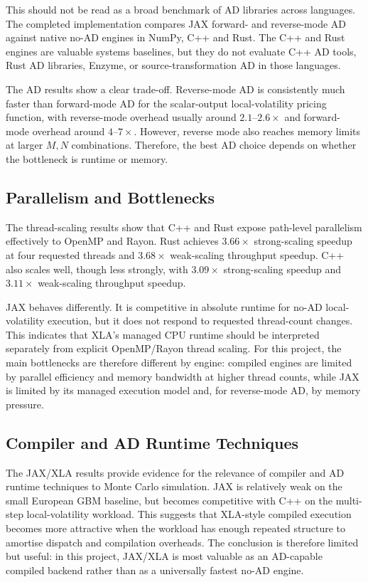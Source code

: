 This should not be read as a broad benchmark of AD libraries across languages.
The completed implementation compares JAX forward- and reverse-mode AD against
native no-AD engines in NumPy, C++ and Rust. The C++ and Rust engines are
valuable systems baselines, but they do not evaluate C++ AD tools, Rust AD
libraries, Enzyme, or source-transformation AD in those languages.

The AD results show a clear trade-off.  Reverse-mode AD is consistently much
faster than forward-mode AD for the scalar-output local-volatility pricing
function, with reverse-mode overhead usually around \(2.1\)--\(2.6\times\)
and forward-mode overhead around \(4\)--\(7\times\).  However, reverse mode
also reaches memory limits at larger \(M,N\) combinations.  Therefore, the
best AD choice depends on whether the bottleneck is runtime or memory.

\subsection{Parallelism and Bottlenecks}
\label{subsec:discussion-parallelism}

The thread-scaling results show that C++ and Rust expose path-level
parallelism effectively to OpenMP and Rayon.  Rust achieves \(3.66\times\)
strong-scaling speedup at four requested threads and \(3.68\times\)
weak-scaling throughput speedup.  C++ also scales well, though less strongly,
with \(3.09\times\) strong-scaling speedup and \(3.11\times\) weak-scaling
throughput speedup.

JAX behaves differently.  It is competitive in absolute runtime for no-AD
local-volatility execution, but it does not respond to requested thread-count
changes.  This indicates that XLA's managed CPU runtime should be interpreted
separately from explicit OpenMP/Rayon thread scaling.  For this project, the
main bottlenecks are therefore different by engine: compiled engines are
limited by parallel efficiency and memory bandwidth at higher thread counts,
while JAX is limited by its managed execution model and, for reverse-mode AD,
by memory pressure.

\subsection{Compiler and AD Runtime Techniques}
\label{subsec:discussion-ai-techniques}

The JAX/XLA results provide evidence for the relevance of compiler and AD
runtime techniques to Monte Carlo simulation.  JAX is relatively weak on the
small European GBM baseline, but becomes competitive with C++ on the
multi-step local-volatility workload.  This suggests that XLA-style compiled
execution becomes more attractive when the workload has enough repeated
structure to amortise dispatch and compilation overheads. The conclusion is
therefore limited but useful: in this project, JAX/XLA is most valuable as an
AD-capable compiled backend rather than as a universally fastest no-AD engine.

